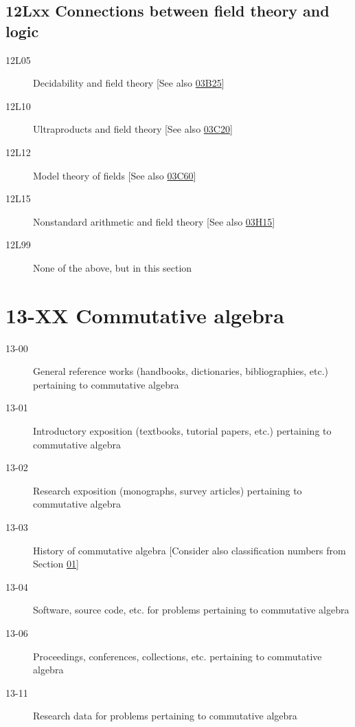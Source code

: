 \documentclass[letterpaper]{article}
\begin{document}
\subsection*{12Lxx  Connections between field theory and logic}\label{12Lxx}
\begin{description}  
\item [12L05]\label{12L05} Decidability and field theory [See also \hyperref[03B25]{03B25}]
\item [12L10]\label{12L10} Ultraproducts and field theory [See also \hyperref[03C20]{03C20}]
\item [12L12]\label{12L12} Model theory of fields [See also \hyperref[03C60]{03C60}]
\item [12L15]\label{12L15} Nonstandard arithmetic and field theory [See also \hyperref[03H15]{03H15}]
\item [12L99]\label{12L99} None of the above, but in this section
\end{description}     
\section*{13-XX Commutative algebra }\label{13-XX}
\begin{description}          
\item [13-00]\label{13-00} General reference works (handbooks, dictionaries, bibliographies, etc.) pertaining to commutative algebra
\item [13-01]\label{13-01} Introductory exposition (textbooks, tutorial papers, etc.) pertaining to commutative algebra
\item [13-02]\label{13-02} Research exposition (monographs, survey articles) pertaining to commutative algebra
\item [13-03]\label{13-03} History of commutative algebra [Consider also classification numbers from Section \hyperref[01-XX]{01}]
\item [13-04]\label{13-04} Software, source code, etc. for problems pertaining to commutative algebra
\item [13-06]\label{13-06} Proceedings, conferences, collections, etc. pertaining to commutative algebra
\item [13-11]\label{13-11} Research data for problems pertaining to commutative algebra
\end{description}          
\end{document}
